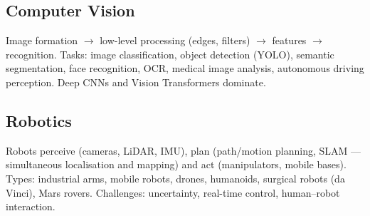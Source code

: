 \subsection{Computer Vision}
Image formation $\to$ low-level processing (edges, filters) $\to$ features $\to$ recognition. Tasks: image classification, object detection (YOLO), semantic segmentation, face recognition, OCR, medical image analysis, autonomous driving perception. Deep CNNs and Vision Transformers dominate.
\subsection{Robotics}
Robots perceive (cameras, LiDAR, IMU), plan (path/motion planning, SLAM --- simultaneous localisation and mapping) and act (manipulators, mobile bases). Types: industrial arms, mobile robots, drones, humanoids, surgical robots (da Vinci), Mars rovers. Challenges: uncertainty, real-time control, human--robot interaction.

